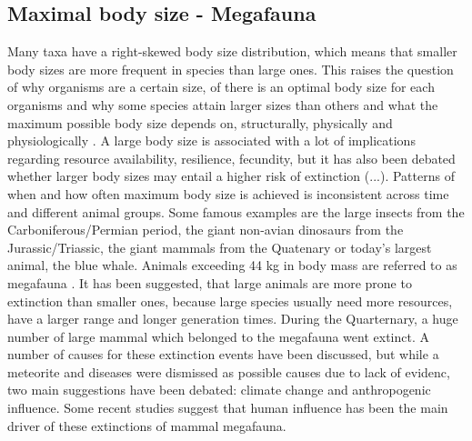 \subsection{Maximal body size - Megafauna}
Many taxa have a right-skewed body size distribution, which means that smaller body sizes are more frequent in species than large ones. This raises the question of why organisms are a certain size, of there is an optimal body size for each organisms and why some species attain larger sizes than others and what the maximum possible body size depends on, structurally, physically and physiologically \citep{Smith2009}.
A large body size is associated with a lot of implications regarding resource availability, resilience, fecundity, but it has also been debated whether larger body sizes may entail a higher risk of extinction (...).
Patterns of when and how often maximum body size is achieved is inconsistent across time and different animal groups.
Some famous examples are the large insects from the Carboniferous/Permian period, the giant non-avian dinosaurs from the Jurassic/Triassic, the giant mammals from the Quatenary or today's largest animal, the blue whale.
Animals exceeding 44 kg in body mass are referred to as megafauna \citep{Barnosly2004, Sandom2014}.
It has been suggested, that large animals are more prone to extinction than smaller ones, because large species usually need more resources, have a larger range and longer generation times. During the Quarternary, a huge number of large mammal which belonged to the megafauna went extinct.
A number of causes for these extinction events have been discussed, but while a meteorite and diseases were dismissed as possible causes due to lack of evidenc, two main suggestions have been debated: climate change and anthropogenic influence.
Some recent studies \citep{Barnosky2004,Sandom2014,Gibbons2004,Schuster2000} suggest that human influence has been the main driver of these extinctions of mammal megafauna.

